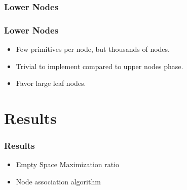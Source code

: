 \documentclass{beamer}
\begin{document}
\subsubsection{Lower Nodes}
\begin{frame}
  \frametitle{Lower Nodes}
  \begin{itemize}
    \item Few primitives per node, but thousands of nodes.
    \item Trivial to implement compared to upper nodes phase.
    \item Favor large leaf nodes.
  \end{itemize}
\end{frame}


\section{Results}
\begin{frame}
  \frametitle{Results}

  \begin{itemize}
    \item Empty Space Maximization ratio
    \item Node association algorithm
  \end{itemize}
\end{frame}
\end{document}
